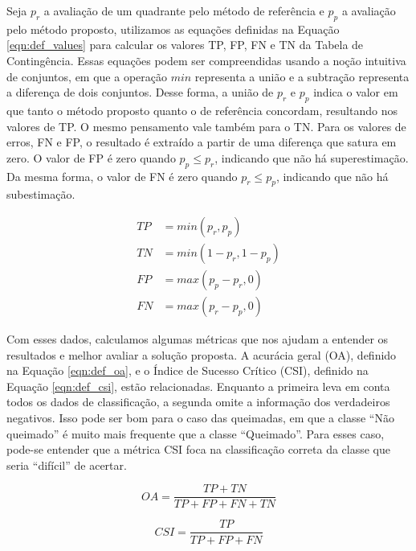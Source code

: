\documentclass[cic,tc]{iiufrgs}
\begin{document}
Seja $p_r$ a avaliação de um quadrante pelo método de referência e $p_p$ a avaliação pelo método proposto, utilizamos as equações definidas na Equação \ref{eqn:def_values} para calcular os valores TP, FP, FN e TN da Tabela de Contingência. Essas equações podem ser compreendidas usando a noção intuitiva de conjuntos, em que a operação $min$ representa a união e a subtração representa a diferença de dois conjuntos. Desse forma, a união de $p_r$ e $p_p$ indica o valor em que tanto o método proposto quanto o de referência concordam, resultando nos valores de TP. O mesmo pensamento vale também para o TN. Para os valores de erros, FN e FP, o resultado é extraído a partir de uma diferença que satura em zero. O valor de FP é zero quando $p_p \le p_r$, indicando que não há superestimação. Da mesma forma, o valor de FN é zero quando $p_r \le p_p$, indicando que não há subestimação.

\begin{equation} \label{eqn:def_values}
\begin{split}
	TP & = min\left(p_r, p_p\right) \\
	TN & = min\left(1 - p_r, 1 - p_p\right) \\
	FP & = max\left(p_p - p_r, 0\right) \\
	FN & = max\left(p_r - p_p, 0\right)
\end{split}
\end{equation}

Com esses dados, calculamos algumas métricas que nos ajudam a entender os resultados e melhor avaliar a solução proposta. A acurácia geral (OA), definido na Equação \ref{eqn:def_oa}, e o Índice de Sucesso Crítico (CSI), definido na Equação \ref{eqn:def_csi}, estão relacionadas. Enquanto a primeira leva em conta todos os dados de classificação, a segunda omite a informação dos verdadeiros negativos. Isso pode ser bom para o caso das queimadas, em que a classe ``Não queimado'' é muito mais frequente que a classe ``Queimado''. Para esses caso, pode-se entender que a métrica CSI foca na classificação correta da classe que seria ``difícil'' de acertar.

\begin{equation} \label{eqn:def_oa}
  OA = \frac{TP + TN}{TP + FP + FN + TN}
\end{equation}

\begin{equation} \label{eqn:def_csi}
  CSI = \frac{TP}{TP + FP + FN}
\end{equation}
\end{document}
